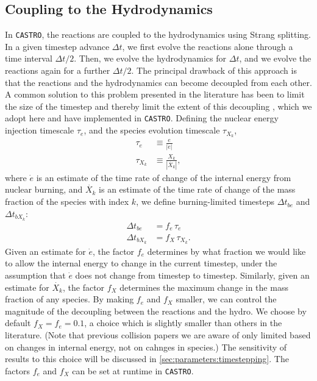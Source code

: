 \documentclass[twocolumn,numberedappendix]{../aastex6}
\newcommand{\castro}{\texttt{CASTRO}}
\begin{document}
\subsection{Coupling to the Hydrodynamics}
\label{sec:hydrocoupling}

In \castro, the reactions are coupled to the hydrodynamics using Strang splitting.
In a given timestep advance $\Delta t$, we first evolve the reactions alone through
a time interval $\Delta t / 2$. Then, we evolve the hydrodynamics for $\Delta t$,
and we evolve the reactions again for a further $\Delta t / 2$. The principal
drawback of this approach is that the reactions and the hydrodynamics can become
decoupled from each other. A common solution to this problem presented in
the literature has been to limit the size of the timestep and thereby limit the
extent of this decoupling \citep{raskin:2010,hawley:2012}, which we adopt here 
and have implemented in \castro. Defining the nuclear energy injection timescale 
$\tau_e$, and the species evolution timescale $\tau_{X_k}$,
\begin{align}
  \tau_e &\equiv \frac{e}{|\dot{e}|} \\
  \tau_{X_k} &\equiv \frac{X_k}{|\dot{X_k}|},
\end{align}
where $\dot{e}$ is an estimate of the time rate of change of the internal energy
from nuclear burning, and $\dot{X_k}$ is an estimate of the time rate of change 
of the mass fraction of the species with index $k$, we define burning-limited 
timesteps $\Delta t_{be}$ and $\Delta t_{bX_k}$:
\begin{align}
  \Delta t_{be} &= f_{e}\, \tau_e \label{eq:timestep_e}\\
  \Delta t_{bX_k} &= f_{X}\, \tau_{X_k}. \label{eq:timestep_X}
\end{align}
Given an estimate for $\dot{e}$, the factor $f_{e}$ determines by what 
fraction we would like to allow the internal energy to change
in the current timestep, under the assumption that $\dot{e}$ does not change from
timestep to timestep. Similarly, given an estimate for $\dot{X_k}$, the factor $f_{X}$ 
determines the maximum change in the mass fraction of any species. By making 
$f_{e}$ and $f_{X}$ smaller, we can control the magnitude of the decoupling 
between the reactions and the hydro. We choose by default $f_{X} = f_{e} = 0.1$, 
a choice which is slightly smaller than others in the literature. (Note that previous 
collision papers we are aware of only limited based on changes in internal energy, 
not on cahnges in species.)  The sensitivity of results to this choice will be discussed in 
\autoref{sec:parameters:timestepping}. The factors $f_{e}$ and $f_{X}$ can be set at runtime in \castro.
\end{document}
